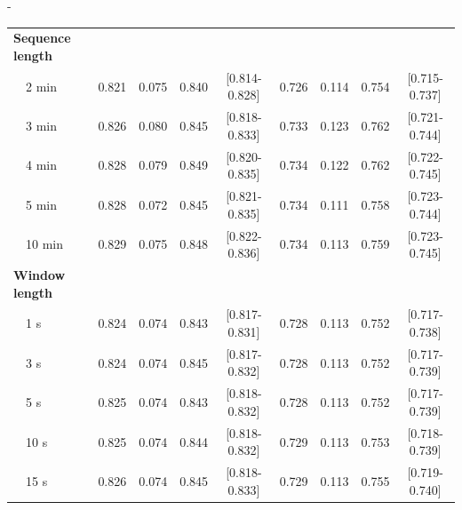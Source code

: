 \begin{table}[t]
\begin{adjustwidth*}{}{-\marginparsep}
\begin{threeparttable}
\begin{tabular}{@{}lcccccccc@{}}
\textbf{Sequence length} &               &             &                 &                       &               &             &                 &                       \\
\(\quad\)2 min                    & 0.821         & 0.075       & 0.840           & [0.814-0.828]         & 0.726         & 0.114       & 0.754           & [0.715-0.737]         \\
\(\quad\)3 min                    & 0.826         & 0.080       & 0.845           & [0.818-0.833]         & 0.733         & 0.123       & 0.762           & [0.721-0.744]         \\
\(\quad\)4 min                    & 0.828         & 0.079       & 0.849           & [0.820-0.835]         & 0.734         & 0.122       & 0.762           & [0.722-0.745]         \\
\(\quad\)5 min                    & 0.828         & 0.072       & 0.845           & [0.821-0.835]         & 0.734         & 0.111       & 0.758           & [0.723-0.744]         \\
\(\quad\)10 min                   & 0.829         & 0.075       & 0.848           & [0.822-0.836]         & 0.734         & 0.113       & 0.759           & [0.723-0.745]         \\
\textbf{Window length}   &               &             &                 &                       &               &             &                 &                       \\
\(\quad\)1 s                      & 0.824         & 0.074       & 0.843           & [0.817-0.831]         & 0.728         & 0.113       & 0.752           & [0.717-0.738]         \\
\(\quad\)3 s                      & 0.824         & 0.074       & 0.845           & [0.817-0.832]         & 0.728         & 0.113       & 0.752           & [0.717-0.739]         \\
\(\quad\)5 s                      & 0.825         & 0.074       & 0.843           & [0.818-0.832]         & 0.728         & 0.113       & 0.752           & [0.717-0.739]         \\
\(\quad\)10 s                     & 0.825         & 0.074       & 0.844           & [0.818-0.832]         & 0.729         & 0.113       & 0.753           & [0.718-0.739]         \\
\(\quad\)15 s                     & 0.826         & 0.074       & 0.845           & [0.818-0.833]         & 0.729         & 0.113       & 0.755           & [0.719-0.740]         \\

\end{tabular}
\end{threeparttable}
\end{adjustwidth*}
\end{table}
